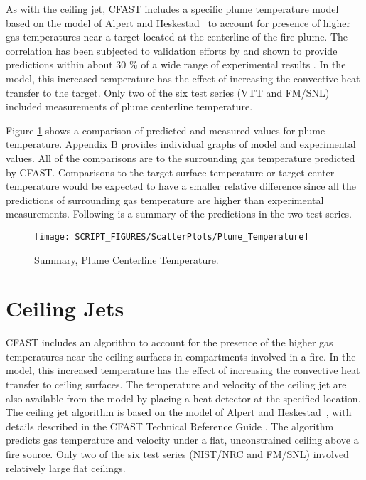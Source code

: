 As with the ceiling jet, CFAST includes a specific plume temperature model based on the model of Alpert and Heskestad~\cite{Alpert:SFPE} to account for presence of higher gas temperatures near a target located at the centerline of the fire plume. The correlation has been subjected to validation efforts by \cite{Valid:Davis_Plumes} and shown to provide predictions within about 30 \% of a wide range of experimental results \cite{Valid:Davis_Plumes}. In the model, this increased temperature has the effect of increasing the convective heat transfer to the target. Only two of the six test series (VTT and FM/SNL) included measurements of plume centerline temperature.

Figure \ref{fig:Plume_Temp_Scatter} shows a comparison of predicted and measured values for plume temperature. Appendix B provides individual graphs of model and experimental values. All of the comparisons are to the surrounding gas temperature predicted by CFAST. Comparisons to the target surface temperature or target center temperature would be expected to have a smaller relative difference since all the predictions of surrounding gas temperature are higher than experimental measurements. Following is a summary of the predictions in the two test series.
\label{Plume Temperature}

\begin{figure}
\begin{center}
\texttt{[image: SCRIPT\_FIGURES/ScatterPlots/Plume\_Temperature]}
\end{center}
\caption[Summary, Plume Centerline Temperature]
{Summary, Plume Centerline Temperature.}
\label{fig:Plume_Temp_Scatter}
\end{figure}


\section{Ceiling Jets}

CFAST includes an algorithm to account for the presence of the higher gas temperatures near the ceiling surfaces in compartments involved in a fire.  In the model, this increased temperature has the effect of increasing the convective heat transfer to ceiling surfaces.  The temperature and velocity of the ceiling jet are also available from the model by placing a heat detector at the specified location.  The ceiling jet algorithm is based on the model of Alpert and Heskestad~\cite{Alpert:SFPE}, with details described in the CFAST Technical Reference Guide \cite{CFAST_Tech_Guide_7}.  The algorithm predicts gas temperature and velocity under a flat, unconstrained ceiling above a fire source.  Only two of the six test series (NIST/NRC and FM/SNL) involved relatively large flat ceilings.


